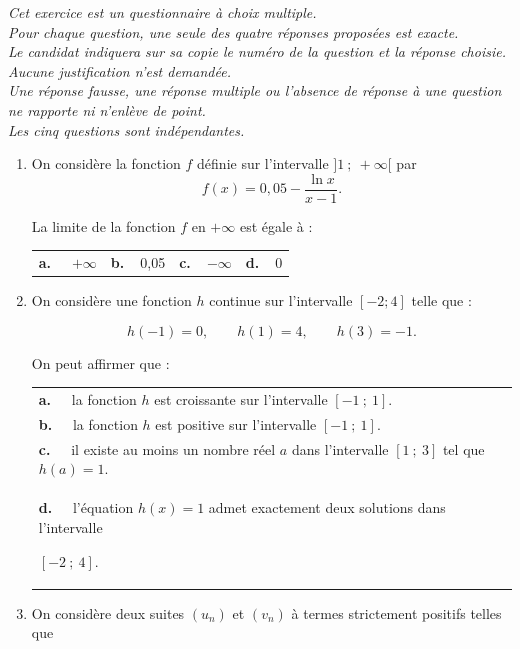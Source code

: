 \medskip

\emph{Cet exercice est un questionnaire à choix multiple. \\Pour chaque question, une seule des quatre réponses proposées est exacte.\\Le candidat indiquera sur sa copie le numéro de la question et la réponse choisie.\\Aucune justification n'est demandée.\\
Une réponse fausse, une réponse multiple ou l'absence de réponse à une question ne rapporte ni n'enlève de point.\\Les cinq questions sont indépendantes.}

\medskip

\begin{enumerate}
\item On considère la fonction $f$ définie sur l'intervalle $]1~;~+\infty[$ par 
\[f(x)= 0,05 - \dfrac{\ln x}{x - 1}.\]

La limite de la fonction $f$ en $+\infty$ est égale à :

\begin{center}
\begin{tabularx}{\linewidth}{*{4}{X}}
\textbf{a.~~} $+\infty$&\textbf{b.~~}0,05&\textbf{c.~~}$-\infty$&\textbf{d.~~}0
\end{tabularx}
\end{center}

\item On considère une fonction $h$ continue sur l'intervalle $[-2 ; 4]$ telle que :

\[h(-1)=0, \qquad h(1) = 4, \qquad h(3) = -1.\]

On peut affirmer que :

\begin{center}
\begin{tabularx}{\linewidth}{X}
\textbf{a.~~} la fonction $h$ est croissante sur l'intervalle $[-1~;~1]$.\\
\textbf{b.~~} la fonction $h$ est positive sur l'intervalle $[-1~;~1]$.\\
\textbf{c.~~} il existe au moins un nombre réel $a$ dans l'intervalle $[1~;~3]$ tel que $h(a) = 1$.\\
\textbf{d.~~} l'équation $h(x)=1$ admet exactement deux solutions dans l'intervalle 

$[-2~;~4]$.
\end{tabularx}
\end{center}

\item On considère deux suites $\left(u_{n}\right)$ et $\left(v_{n}\right)$ à termes strictement positifs telles que 


\end{enumerate}
